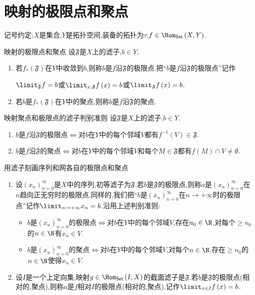 \section{映射的极限点和聚点}

记号约定:$X$是集合,$Y$是拓扑空间,装备的拓扑为$\tau$,$f\in\Hom_{\mathsf{Set}}\left(X,Y\right)$.

\begin{definition}{映射的极限点和聚点}{}
	设$\mathfrak{F}$是$X$上的滤子,$b\in Y$.
	\begin{enumerate}
		\item 若$f_{\ast}\left(\mathfrak{F}\right)$在$Y$中收敛到$b$,则称$b$是$f$沿$\mathfrak{F}$的极限点.把``$b$是$f$沿$\mathfrak{F}$的极限点''记作
		\begin{center}
			$\limit_{\mathfrak{F}}f=b$或$\limit_{x,\mathfrak{F}}f\left(x\right)=b$或$\limit_{\mathfrak{F}}f\left(x\right)=b$.
		\end{center}
		\item 若$b$是$f_{\ast}\left(\mathfrak{F}\right)$在$Y$中的聚点,则称$b$是$f$沿$\mathfrak{F}$的聚点.
	\end{enumerate}
\end{definition}

\begin{proposition}{映射聚点和极限点的滤子判别准则}{}
	设$\mathfrak{F}$是$X$上的滤子,$b\in Y$.
	\begin{enumerate}
		\item $b$是$f$沿$\mathfrak{F}$的极限点$\iff$对$b$在$Y$中的每个邻域$V$都有$f^{-1}\left(V\right)\in\mathfrak{F}$.
		\item $b$是$f$沿$\mathfrak{F}$的聚点$\iff$对$b$在$Y$中的每个邻域$V$和每个$M\in\mathfrak{F}$都有$f\left(M\right)\cap V\neq\emptyset$.
	\end{enumerate}
\end{proposition}

\begin{example}{用滤子刻画序列和网各自的极限点和聚点}{}
	\begin{enumerate}
		\item 设$\left(x_{n}\right)_{n=0}^{\infty}$是$X$中的序列,初等滤子为$\mathfrak{F}$.若$b$是$\mathfrak{F}$的极限点,则称$a$是$\left(x_{n}\right)_{n=0}^{\infty}$在$n$趋向正无穷时的极限点.同样的,我们把``$b$是$\left(x_{n}\right)_{n=0}^{\infty}$在$n\to+\infty$时的极限点''记作$\limit_{n\to+\infty}x_{n}=b$.沿用上述判别准则:
		\begin{itemize}
			\item $b$是$\left(x_{n}\right)_{n=0}^{\infty}$的极限点$\iff$对$b$在$Y$中的每个邻域$V$,存在$n_{0}\in\N$,对每个$\geq n_{0}$的$n\in\N$有$x_{n}\in V$.
			\item $b$是$\left(x_{n}\right)_{n=0}^{\infty}$的聚点$\iff$对$b$在$Y$中的每个邻域$V$,对每个$n\in\N$,存在$\geq n_{0}$的$n\in\N$使得$x_{n}\in V$.
		\end{itemize}
		\item 设$I$是一个上定向集,映射$g\in\Hom_{\mathsf{Set}}\left(I,X\right)$的截面滤子是$\mathfrak{F}$.若$b$是$\mathfrak{F}$的极限点(相对的,聚点),则称$a$是$f$相对$I$的极限点(相对的,聚点),记作$\limit_{x\in I}f\left(x\right)=b$.
	\end{enumerate}
\end{example}

